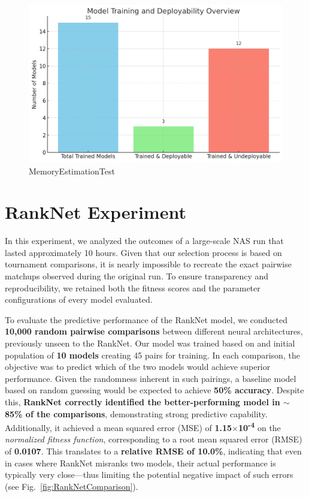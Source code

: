 \bigskip

\begin{figure}[ht]
    \centering
    \includegraphics[width=0.85\linewidth]{Pictures/MemoryEstimationTest.png}
    \caption{MemoryEstimationTest}
    \label{fig:memoryEstimationTest}
\end{figure}





\section{RankNet Experiment}
\label{sec:ranknet_experiment}
In this experiment, we analyzed the outcomes of a large-scale NAS run that lasted approximately 10 hours. Given that our selection process is based on tournament comparisons, it is nearly impossible to recreate the exact pairwise matchups observed during the original run. To ensure transparency and reproducibility, we retained both the fitness scores and the parameter configurations of every model evaluated.

To evaluate the predictive performance of the RankNet model, we conducted \textbf{10{,}000 random pairwise comparisons} between different neural architectures, previously unseen to the RankNet. Our model was trained based on and initial population of \textbf{10 models} creating 45 pairs for training. In each comparison, the objective was to predict which of the two models would achieve superior performance. Given the randomness inherent in such pairings, a baseline model based on random guessing would be expected to achieve \textbf{50\% accuracy}. Despite this, \textbf{RankNet correctly identified the better-performing model in $\sim$85\% of the comparisons}, demonstrating strong predictive capability. Additionally, it achieved a mean squared error (MSE) of \textbf{1.15$\times$10\textsuperscript{-4}} on the \textit{normalized fitness function}, corresponding to a root mean squared error (RMSE) of \textbf{0.0107}. This translates to a \textbf{relative RMSE of 10.0\%}, indicating that even in cases where RankNet misranks two models, their actual performance is typically very close—thus limiting the potential negative impact of such errors (see Fig.~\ref{fig:RankNetComparison}).


